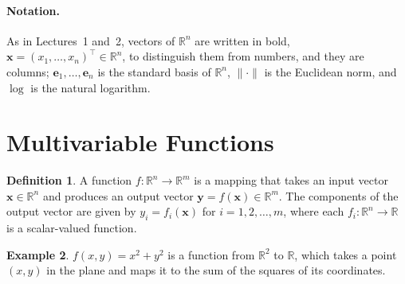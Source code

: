 \documentclass[11pt]{article}
\newcommand{\norm}[1]{\lVert #1 \rVert}
\theoremstyle{definition}
\newtheorem{definition}{Definition}[section]
\newtheorem{example}[definition]{Example}
\theoremstyle{plain}
\theoremstyle{remark}
\begin{document}
\paragraph{Notation.} As in Lectures~1 and~2, vectors of $\mathbb{R}^n$ are written in bold, $\mathbf{x} = (x_1, \ldots, x_n)^\top \in \mathbb{R}^n$, to distinguish them from numbers, and they are columns; $\mathbf{e}_1, \ldots, \mathbf{e}_n$ is the standard basis of $\mathbb{R}^n$, $\norm{\cdot}$ is the Euclidean norm, and $\log$ is the natural logarithm.

\section{Multivariable Functions}

\begin{definition}\label{def:multivariable}
    A function $f: \mathbb{R}^n \to \mathbb{R}^m$ is a mapping that takes an input vector $\mathbf{x} \in \mathbb{R}^n$ and produces an output vector $\mathbf{y} = f(\mathbf{x}) \in \mathbb{R}^m$.
    The components of the output vector are given by $y_i = f_i(\mathbf{x})$ for $i = 1, 2, \ldots, m$, where each $f_i: \mathbb{R}^n \to \mathbb{R}$ is a scalar-valued function.
\end{definition}

\begin{example}\label{ex:paraboloid}
    $f(x, y) = x^2 + y^2$ is a function from $\mathbb{R}^2$ to $\mathbb{R}$, which takes a point $(x, y)$ in the plane and maps it to the sum of the squares of its coordinates.
\end{example}
\end{document}
